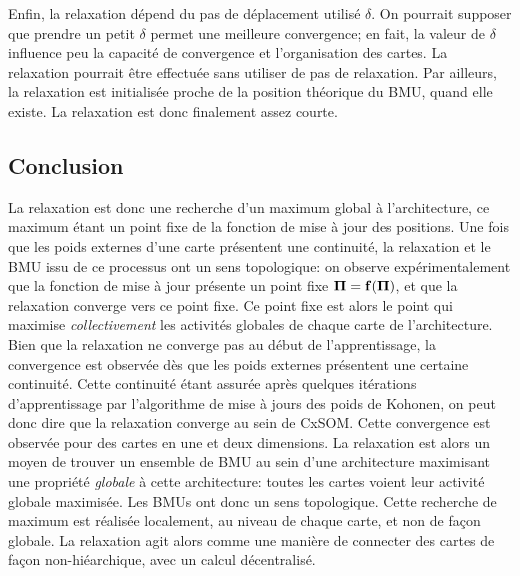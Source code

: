 Enfin, la relaxation dépend du pas de déplacement utilisé $\delta$. On pourrait supposer que prendre un petit $\delta$ permet une meilleure convergence; en fait, la valeur de $\delta$ influence peu la capacité de convergence et l'organisation des cartes. La relaxation pourrait être effectuée sans utiliser de pas de relaxation. Par ailleurs, la relaxation est initialisée proche de la position théorique du BMU, quand elle existe. La relaxation est donc finalement assez courte.

\subsection{Conclusion}
La relaxation est donc une recherche d'un maximum global à l'architecture, ce maximum étant un point fixe de la fonction de mise à jour des positions.
Une fois que les poids externes d'une carte présentent une continuité, la relaxation et le BMU issu de ce processus ont un sens topologique: on observe expérimentalement que la fonction de mise à jour présente un point fixe $\mathbf{\Pi} = \mathbf{f}(\mathbf{\Pi})$, et que la relaxation converge vers ce point fixe. Ce point fixe est alors le point qui maximise \emph{collectivement} les activités globales de chaque carte de l'architecture.
Bien que la relaxation ne converge pas au début de l'apprentissage, la convergence est observée dès que les poids externes présentent une certaine continuité. Cette continuité étant assurée après quelques itérations d'apprentissage par l'algorithme de mise à jours des poids de Kohonen, on peut donc dire que la relaxation converge au sein de CxSOM. Cette convergence est observée pour des cartes en une et deux dimensions.
La relaxation est alors un moyen de trouver un ensemble de BMU au sein d'une architecture maximisant une propriété \emph{globale} à cette architecture: toutes les cartes voient leur activité globale maximisée. Les BMUs ont donc un sens topologique. Cette recherche de maximum est réalisée localement, au niveau de chaque carte, et non de façon globale. La relaxation agit alors comme une manière de connecter des cartes de façon non-hiéarchique, avec un calcul décentralisé.